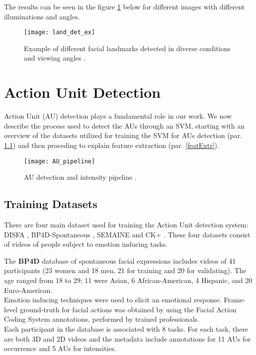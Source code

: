 The results can be seen in the figure \ref{fig:land_det_ex} below for different images with different illuminations and angles. 

\begin{figure}[H]
	\centering
	\texttt{[image: land\_det\_ex]}
	\caption{Example of different facial landmarks detected in diverse conditions and viewing angles \cite{Baltru2018}.}
	\label{fig:land_det_ex}
\end{figure}

\clearpage

\section{Action Unit Detection} \label{au_det}
Action Unit (AU) detection plays a fundamental role in our work. We now describe the process used to detect the AUs through an SVM, starting with an overview of the datasets utilized for training the SVM for AUs detection (par. \ref{trainDS}) and then proceding to explain feature extraction (par. \ref{featExtr}).

\begin{figure}[H]
	\centering
	\texttt{[image: AU\_pipeline]}
	\caption{AU detection and intensity pipeline \cite{Baltru2015}.}
	\label{fig:AU_pipeline}
\end{figure}

\subsection{Training Datasets} \label{trainDS}
There are four main dataset used for training the Action Unit detection system: DISFA \cite{DISFA}, BP4D-Spontaneous \cite{BP4D-Spontaneous}, SEMAINE \cite{SEMAINE} and CK+ \cite{CK+}. These four datasets consist of videos of people subject to emotion inducing tasks.

The \textbf{BP4D} database of spontaneous facial expressions includes videos of 41 participants (23 women and 18 men, 21 for training and 20 for validating). The age ranged from 18 to 29; 11 were Asian, 6 African-American, 4 Hispanic, and 20 Euro-American. \\
Emotion inducing techniques were used to elicit an emotional response. Frame-level ground-truth for facial actions was obtained by using the Facial Action Coding System annotations, performed by trained professionals. \\
Each participant in the database is associated with 8 tasks. For each task, there are both 3D and 2D videos and the metadata include annotations for 11 AUs for occurrence and 5 AUs for intensities.

